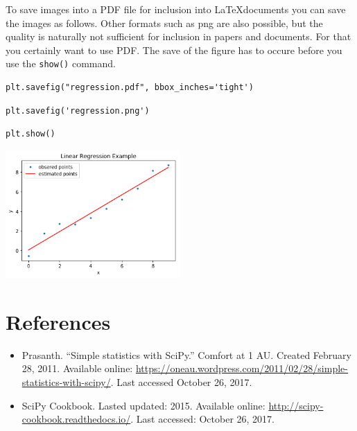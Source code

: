 To save images into a PDF file for inclusion into \LaTeX documents you
can save the images as follows. Other formats such as png are also
possible, but the quality is naturally not sufficient for inclusion in
papers and documents. For that you certainly want to use PDF. The save
of the figure has to occure before you use the \verb|show()| command.

\begin{verbatim}
plt.savefig("regression.pdf", bbox_inches='tight')
\end{verbatim}

\begin{verbatim}
plt.savefig('regression.png') 
\end{verbatim}

\begin{verbatim}
plt.show()
\end{verbatim}

\begin{center}
\includegraphics[width=0.5\textwidth]{scipy/output_40_0.png}
\end{center}

\section{References}\label{references}

\begin{itemize}
\item
  Prasanth. ``Simple statistics with SciPy.'' Comfort at 1 AU. Created
  February 28, 2011. Available online:
  \url{https://oneau.wordpress.com/2011/02/28/simple-statistics-with-scipy/}.
  Last accessed October 26, 2017.
\item
  SciPy Cookbook. Lasted updated: 2015. Available online:
  \url{http://scipy-cookbook.readthedocs.io/}. Last accessed: October
  26, 2017.
\end{itemize}
